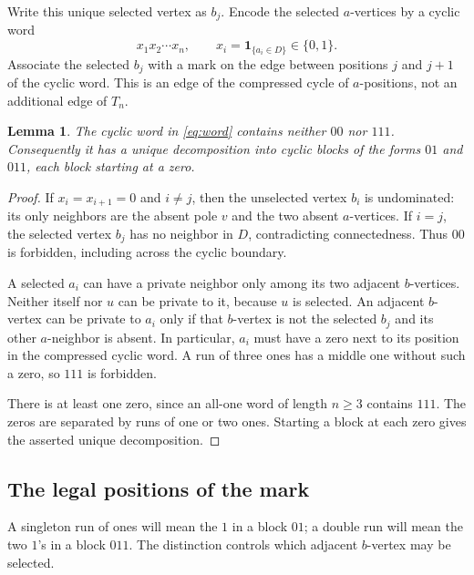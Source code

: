 \documentclass[11pt,letterpaper]{article}
\numberwithin{equation}{section}
\newtheorem{lemma}[theorem]{Lemma}
\theoremstyle{definition}
\theoremstyle{remark}
\newcommand{\one}{\mathbf 1}
\begin{document}
Write this unique selected vertex as $b_j$. Encode the selected
$a$-vertices by a cyclic word
\begin{equation}\label{eq:word}
 x_1x_2\cdots x_n,\qquad x_i=\one_{\{a_i\in D\}}\in\{0,1\}.
\end{equation}
Associate the selected $b_j$ with a mark on the edge between positions
$j$ and $j+1$ of the cyclic word. This is an edge of the compressed
cycle of $a$-positions, not an additional edge of $T_n$.

\begin{lemma}\label{lem:patterns}
The cyclic word in \eqref{eq:word} contains neither $00$ nor $111$.
Consequently it has a unique decomposition into cyclic blocks of the
forms $01$ and $011$, each block starting at a zero.
\end{lemma}
\begin{proof}
If $x_i=x_{i+1}=0$ and $i\ne j$, then the unselected vertex $b_i$
is undominated: its only neighbors are the absent pole $v$ and the
two absent $a$-vertices. If $i=j$, the selected vertex $b_j$ has no
neighbor in $D$, contradicting connectedness. Thus $00$ is forbidden,
including across the cyclic boundary.

A selected $a_i$ can have a private neighbor only among its two
adjacent $b$-vertices. Neither itself nor $u$ can be private to it,
because $u$ is selected. An adjacent $b$-vertex can be private to
$a_i$ only if that $b$-vertex is not the selected $b_j$ and its other
$a$-neighbor is absent. In particular, $a_i$ must have a zero next
to its position in the compressed cyclic word. A run of three ones
has a middle one without such a zero, so $111$ is forbidden.

There is at least one zero, since an all-one word of length $n\ge3$
contains $111$. The zeros are separated by runs of one or two ones.
Starting a block at each zero gives the asserted unique decomposition.
\end{proof}

\subsection{The legal positions of the mark}

A singleton run of ones will mean the $1$ in a block $01$; a double
run will mean the two $1$'s in a block $011$. The distinction controls
which adjacent $b$-vertex may be selected.
\end{document}
